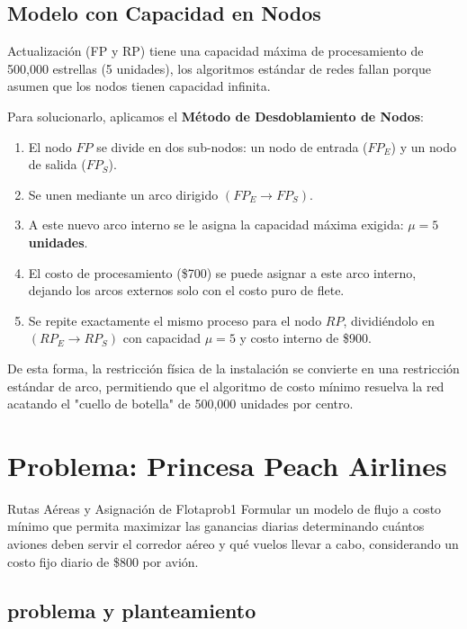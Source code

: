 \documentclass[10pt,a4paper]{article}
\begin{document}
\subsection{Modelo con Capacidad en Nodos}

Actualización (FP y RP) tiene una capacidad máxima 
de procesamiento de 500,000 estrellas (5 unidades), 
los algoritmos estándar de redes fallan porque asumen 
que los nodos tienen capacidad infinita.

Para solucionarlo, aplicamos el \textbf{Método de Desdoblamiento de Nodos}:
\begin{enumerate}
    \item El nodo $FP$ se divide en dos sub-nodos: un nodo de entrada ($FP_E$) y un nodo de salida ($FP_S$).
    \item Se unen mediante un arco dirigido $(FP_E \to FP_S)$.
    \item A este nuevo arco interno se le asigna la capacidad máxima exigida: \textbf{$\mu = 5$ unidades}.
    \item El costo de procesamiento (\$700) se puede asignar a este arco interno, dejando los arcos externos solo con el costo puro de flete.
    \item Se repite exactamente el mismo proceso para el nodo $RP$, dividiéndolo en $(RP_E \to RP_S)$ con capacidad $\mu = 5$ y costo interno de \$900.
\end{enumerate}

De esta forma, la restricción física de la instalación se convierte en una restricción estándar de arco, permitiendo que el algoritmo de costo mínimo resuelva la red acatando el "cuello de botella" de 500,000 unidades por centro.

\newpage


\section{Problema: Princesa Peach Airlines}

\begin{ejercicio}{Rutas Aéreas y Asignación de Flota}{prob1}
Formular un modelo de flujo a costo mínimo que permita maximizar las ganancias diarias determinando cuántos aviones deben servir el corredor aéreo y qué vuelos llevar a cabo, considerando un costo fijo diario de \$800 por avión.
\end{ejercicio}

\subsection{problema y planteamiento}
\end{document}

